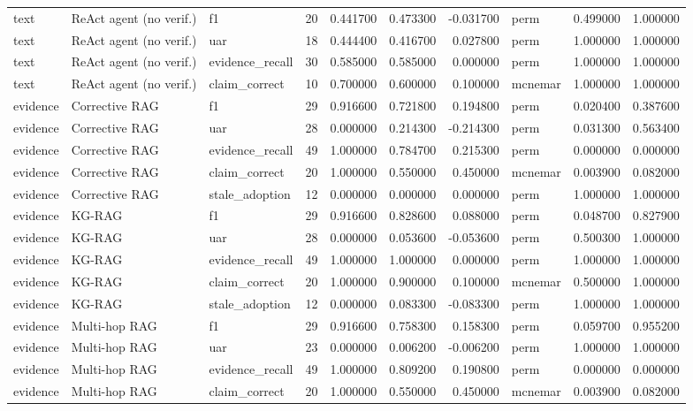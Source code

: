 \begin{table}
\begin{tabular}{lllrrrrlrr}
text & ReAct agent (no verif.) & f1 & 20 & 0.441700 & 0.473300 & -0.031700 & perm & 0.499000 & 1.000000 \\
text & ReAct agent (no verif.) & uar & 18 & 0.444400 & 0.416700 & 0.027800 & perm & 1.000000 & 1.000000 \\
text & ReAct agent (no verif.) & evidence\_recall & 30 & 0.585000 & 0.585000 & 0.000000 & perm & 1.000000 & 1.000000 \\
text & ReAct agent (no verif.) & claim\_correct & 10 & 0.700000 & 0.600000 & 0.100000 & mcnemar & 1.000000 & 1.000000 \\
evidence & Corrective RAG & f1 & 29 & 0.916600 & 0.721800 & 0.194800 & perm & 0.020400 & 0.387600 \\
evidence & Corrective RAG & uar & 28 & 0.000000 & 0.214300 & -0.214300 & perm & 0.031300 & 0.563400 \\
evidence & Corrective RAG & evidence\_recall & 49 & 1.000000 & 0.784700 & 0.215300 & perm & 0.000000 & 0.000000 \\
evidence & Corrective RAG & claim\_correct & 20 & 1.000000 & 0.550000 & 0.450000 & mcnemar & 0.003900 & 0.082000 \\
evidence & Corrective RAG & stale\_adoption & 12 & 0.000000 & 0.000000 & 0.000000 & perm & 1.000000 & 1.000000 \\
evidence & KG-RAG & f1 & 29 & 0.916600 & 0.828600 & 0.088000 & perm & 0.048700 & 0.827900 \\
evidence & KG-RAG & uar & 28 & 0.000000 & 0.053600 & -0.053600 & perm & 0.500300 & 1.000000 \\
evidence & KG-RAG & evidence\_recall & 49 & 1.000000 & 1.000000 & 0.000000 & perm & 1.000000 & 1.000000 \\
evidence & KG-RAG & claim\_correct & 20 & 1.000000 & 0.900000 & 0.100000 & mcnemar & 0.500000 & 1.000000 \\
evidence & KG-RAG & stale\_adoption & 12 & 0.000000 & 0.083300 & -0.083300 & perm & 1.000000 & 1.000000 \\
evidence & Multi-hop RAG & f1 & 29 & 0.916600 & 0.758300 & 0.158300 & perm & 0.059700 & 0.955200 \\
evidence & Multi-hop RAG & uar & 23 & 0.000000 & 0.006200 & -0.006200 & perm & 1.000000 & 1.000000 \\
evidence & Multi-hop RAG & evidence\_recall & 49 & 1.000000 & 0.809200 & 0.190800 & perm & 0.000000 & 0.000000 \\
evidence & Multi-hop RAG & claim\_correct & 20 & 1.000000 & 0.550000 & 0.450000 & mcnemar & 0.003900 & 0.082000 \\

\end{tabular}
\end{table}
